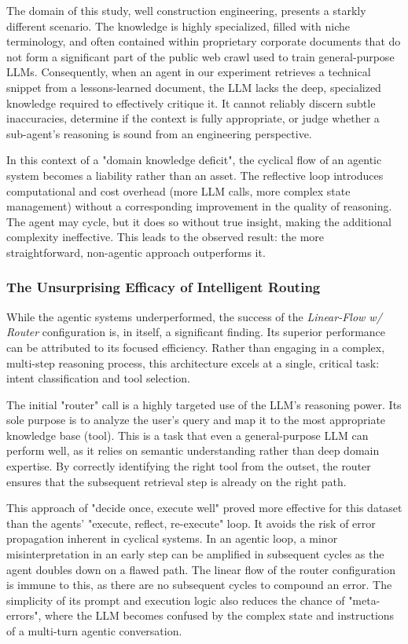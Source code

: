             The domain of this study, well construction engineering, presents a starkly different scenario. The knowledge is highly specialized, filled with niche terminology, and often contained within proprietary corporate documents that do not form a significant part of the public web crawl used to train general-purpose LLMs. Consequently, when an agent in our experiment retrieves a technical snippet from a lessons-learned document, the LLM lacks the deep, specialized knowledge required to effectively critique it. It cannot reliably discern subtle inaccuracies, determine if the context is fully appropriate, or judge whether a sub-agent's reasoning is sound from an engineering perspective.
            
            In this context of a "domain knowledge deficit", the cyclical flow of an agentic system becomes a liability rather than an asset. The reflective loop introduces computational and cost overhead (more LLM calls, more complex state management) without a corresponding improvement in the quality of reasoning. The agent may cycle, but it does so without true insight, making the additional complexity ineffective. This leads to the observed result: the more straightforward, non-agentic approach outperforms it.
        
        \subsubsection{The Unsurprising Efficacy of Intelligent Routing}
            
            While the agentic systems underperformed, the success of the \textit{Linear-Flow w/ Router} configuration is, in itself, a significant finding. Its superior performance can be attributed to its focused efficiency. Rather than engaging in a complex, multi-step reasoning process, this architecture excels at a single, critical task: intent classification and tool selection.
            
            The initial "router" call is a highly targeted use of the LLM's reasoning power. Its sole purpose is to analyze the user's query and map it to the most appropriate knowledge base (tool). This is a task that even a general-purpose LLM can perform well, as it relies on semantic understanding rather than deep domain expertise. By correctly identifying the right tool from the outset, the router ensures that the subsequent retrieval step is already on the right path.
            
            This approach of "decide once, execute well" proved more effective for this dataset than the agents' "execute, reflect, re-execute" loop. It avoids the risk of error propagation inherent in cyclical systems. In an agentic loop, a minor misinterpretation in an early step can be amplified in subsequent cycles as the agent doubles down on a flawed path. The linear flow of the router configuration is immune to this, as there are no subsequent cycles to compound an error. The simplicity of its prompt and execution logic also reduces the chance of "meta-errors", where the LLM becomes confused by the complex state and instructions of a multi-turn agentic conversation.
        
